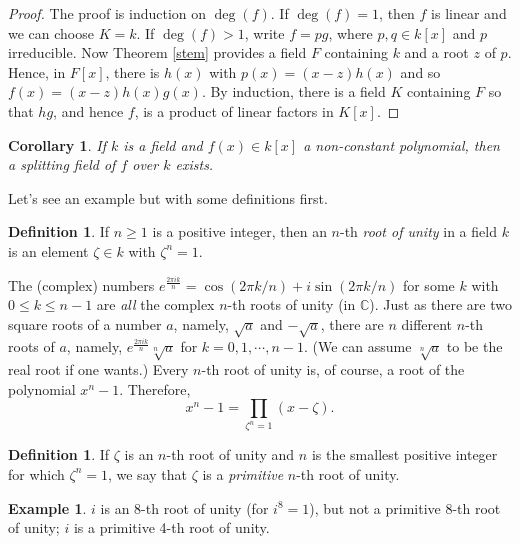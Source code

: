 \documentclass[12pt]{report}
\newtheorem{corollary}[theorem]{Corollary}
\theoremstyle{definition}
\newtheorem{definition}[theorem]{Definition}
\newtheorem{example}[theorem]{Example}
\newcommand{\CC}{\mathbb{C}}
\begin{document}
\begin{proof}
	The proof is induction on $\deg(f)$. If $\deg(f)=1$, then $f$ is linear and we can choose $K=k$. If $\deg(f) > 1$, write $f=pg$, where $p,q\in k[x]$ and $p$ irreducible. Now Theorem \ref{stem} provides a field $F$ containing $k$ and a root $z$ of $p$. Hence, in $F[x]$, there is $h(x)$ with $p(x)=(x-z)h(x)$ and so $f(x)=(x-z)h(x)g(x)$. By induction, there is a field $K$ containing $F$ so that $hg$, and hence $f$, is a product of linear factors in $K[x]$.
\end{proof}

\begin{corollary}
	If $k$ is a field and $f(x)\in k[x]$ a non-constant polynomial, then a splitting field of $f$ over $k$ exists.
\end{corollary}

Let's see an example but with some definitions first.

\begin{definition}
	If $n \geq  1$ is a positive integer, then an $n$-th \emph{root of unity} in a field $k$ is an element $\zeta \in  k$ with $\zeta^n = 1$.
\end{definition}


The (complex) numbers $e^{\frac{2\pi i k}{n}} = \cos(2\pi k/n) + i \sin(2\pi k/n)$ for some $k$ with $0 \leq  k \leq  n- 1$ are \emph{all} the complex $n$-th roots of unity (in $\CC$). Just as there are two square roots of a number $a$, namely, $\sqrt{a}$ and $-\sqrt{a}$, there are $n$ different $n$-th roots of $a$, namely, $e^{\frac{2\pi i k}{n}}\sqrt[n]{a}$  for $k = 0, 1,\cdots , n - 1$. (We can assume $\sqrt[n]{a}$ to be the real root if one wants.) Every $n$-th root of unity is, of course, a root of the polynomial $x^n- 1$. Therefore, \begin{equation}\label{cycoeq1}
	x^n - 1 = \prod_{\zeta^n=1}(x -\zeta).
\end{equation}


\begin{definition}
	If $\zeta$ is an $n$-th root of unity and $n$ is the smallest positive integer for which $\zeta^n = 1$, we say that $\zeta$ is a \emph{primitive} $n$-th root of unity.
\end{definition}

\begin{example}
	$i$ is an 8-th root of unity (for $i^8 = 1$), but not a primitive 8-th root of unity; $i$ is a primitive 4-th root of unity.
\end{example}
\end{document}

